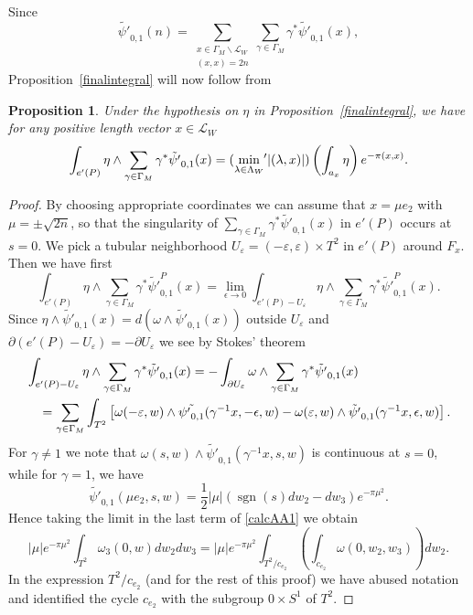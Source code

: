 \documentclass[12pt,leqno]{amsart}
\numberwithin{equation}{section}
\theoremstyle{plain}
\newtheorem{proposition}[theorem]{Proposition}
\theoremstyle{definition}
\theoremstyle{remark}
\newcommand{\G}{\Gamma}
\newcommand{\g}{\gamma}
\newcommand{\la}{\lambda}
\newcommand{\back}{\backslash}
\newcommand{\calL}{\mathcal{L}}
\newcommand{\eps}{\varepsilon}
\newcommand{\sgn}{\operatorname{sgn}}
\begin{document}
Since 
\[
\tilde{\psi'}_{0,1}(n) = \sum_{ \substack{x\in \G_M \back \mathcal{L}_W \\ (x,x)=2n}} \sum_{ \g \in \G_M} \g^{\ast} \tilde{\psi'}_{0,1}(x),
\]
Proposition~\ref{finalintegral} will now follow from

\begin{proposition}
Under the hypothesis on $\eta$ in Proposition~\ref{finalintegral}, we have for any positive length vector $x \in \calL_W$
\[
\int_{e'(P)} \eta \wedge  \sum_{ \g \in \G_M} \g^{\ast} \tilde{\psi'}_{0,1}(x) = (\min_{\la \in \Lambda_W}   {\hspace{-2pt}'}|(\la,x)|) \left(\int_{a_x} \eta \right) e^{-\pi (x,x)}.
\]
\end{proposition}


\begin{proof}
By choosing appropriate coordinates we can assume that $x = \mu e_2$ with $\mu = \pm \sqrt{2n}$, so that the singularity of $\sum_{ \g \in \G_M} \g^{\ast} \tilde{\psi'}_{0,1}(x)$ in $e'(P)$ occurs at $s=0$. 
We pick a tubular neighborhood $U_\eps= (-\eps,\eps) \times T^2$ in $e'(P)$ around $F_x$. Then we have first
\[
\int_{e'(P)} \eta \wedge  \sum_{ \g \in \G_M} \g^{\ast} \tilde{\psi'}_{0,1}^P(x)= 
  \lim_{\epsilon \to 0} \int_{e'(P) - U_{\eps}} \eta \wedge   \sum_{ \g \in \G_M} \g^{\ast}\tilde{\psi'}_{0,1}^P(x).
 \]
Since $\eta \wedge \tilde{\psi'}_{0,1}(x) = d(\omega \wedge \tilde{\psi'}_{0,1}(x))$ outside $U_{\eps}$ and $\partial (e'(P) - U_{\eps}) =
- \partial U_{\eps}$   we see by Stokes' theorem
\begin{align}\label{calcAA1}
&\int_{e'(P) - U_{\eps}} \eta \wedge  \sum_{ \g \in \G_M} \g^{\ast} \tilde{\psi'}_{0,1}(x)
= - \int_{\partial U_{\eps}} \omega \wedge   \sum_{ \g \in \G_M} \g^{\ast}\tilde{\psi'}_{0,1}(x) \\
& \quad = \sum_{ \g \in \G_M}  \int_{T^2} \left[\omega(-\eps,w) \wedge \tilde{{\psi'}_{0,1}}(\g^{-1}x,-\epsilon,w) - 
\omega(\eps,w) \wedge \tilde{\psi'}_{0,1}(\g^{-1} x,\epsilon,w) \right]. \notag
\end{align}
For $\g \ne 1$ we note that $\omega(s,w) \wedge \tilde{\psi'}_{0,1}(\g^{-1}x,s,w)$ is continuous at $s=0$, while for $\g=1$, we have
\begin{equation}\label{psi'formula}
 \tilde{\psi'}_{0,1}(\mu e_2,s,w) =  \frac12|\mu| (\sgn(s)dw_2-dw_3) e^{- \pi \mu^2}.
 \end{equation}
Hence taking the limit in the last term of  \eqref{calcAA1} we obtain 
\[
|\mu| e^{- \pi \mu^2}\int_{T^2} \omega_3(0,w) dw_2dw_3 = |\mu|  e^{- \pi \mu^2}\int_{T^2/ c_{e_2}} \left( \int_{c_{e_2}} \omega(0,w_2,w_3) \right) dw_2.
 \]In the expression $T^2/ c_{e_2}$ (and for the rest of this proof)  we have abused notation and identified the cycle $c_{e_2}$ with the subgroup $0 \times S^1$ of $T^2$.


\end{proof}
\end{document}
